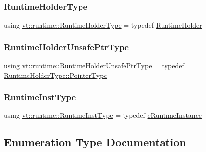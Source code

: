 \subsubsection{\texorpdfstring{Runtime\+Holder\+Type}{RuntimeHolderType}}
{\footnotesize\ttfamily using \hyperlink{namespacevt_1_1runtime_ab09d044cce417fbcdb7e1e29b7aabbc3}{vt\+::runtime\+::\+Runtime\+Holder\+Type} = typedef \hyperlink{structvt_1_1runtime_1_1_runtime_holder}{Runtime\+Holder}}

\mbox{\label{namespacevt_1_1runtime_a69931905b04961a874e4a70a43083a83}} 
\subsubsection{\texorpdfstring{Runtime\+Holder\+Unsafe\+Ptr\+Type}{RuntimeHolderUnsafePtrType}}
{\footnotesize\ttfamily using \hyperlink{namespacevt_1_1runtime_a69931905b04961a874e4a70a43083a83}{vt\+::runtime\+::\+Runtime\+Holder\+Unsafe\+Ptr\+Type} = typedef \hyperlink{structvt_1_1runtime_1_1_runtime_holder_a9740e8aa7487fcf38b67a7e160d7b046}{Runtime\+Holder\+Type\+::\+Pointer\+Type}}

\mbox{\label{namespacevt_1_1runtime_a012376d47cd009c2e6305f17de9fcfe9}} 
\subsubsection{\texorpdfstring{Runtime\+Inst\+Type}{RuntimeInstType}}
{\footnotesize\ttfamily using \hyperlink{namespacevt_1_1runtime_afca910c1b38b3975f7c1da8001a77d58}{vt\+::runtime\+::\+Runtime\+Inst\+Type} = typedef \hyperlink{namespacevt_1_1runtime_afca910c1b38b3975f7c1da8001a77d58}{e\+Runtime\+Instance}}



\subsection{Enumeration Type Documentation}
\mbox{\label{namespacevt_1_1runtime_afca910c1b38b3975f7c1da8001a77d58}} 
